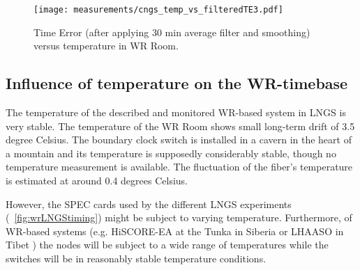 \begin{figure}[!t]
\centering
\texttt{[image: measurements/cngs\_temp\_vs\_filteredTE3.pdf]}
\caption{Time Error (after applying 30 min average filter and smoothing) versus temperature in WR Room.}
\label{fig:temp.vs.filteredTE}
\end{figure}



\subsection{Influence of temperature on the WR-timebase}

The temperature of the described and monitored WR-based system in LNGS is very stable. 
The temperature of the WR Room
shows small long-term drift of 3.5 degree Celsius. The boundary clock switch 
is installed in a cavern in the heart of a mountain and its temperature is supposedly considerably 
stable, though no temperature measurement is available. The fluctuation of the fiber's temperature 
is estimated at around 0.4 degrees Celsius. 

However, the SPEC cards used by the different LNGS experiments 
(\figurename~\ref{fig:wrLNGStiming}) might be subject to varying temperature. 
Furthermore,  of WR-based systems (e.g. HiSCORE-EA at the Tunka 
in Siberia \cite{biblio:tunka} or LHAASO in Tibet \cite{biblio:LHAASO}) the nodes will be subject 
to a wide range of temperatures while the switches will be in reasonably stable
temperature conditions.

